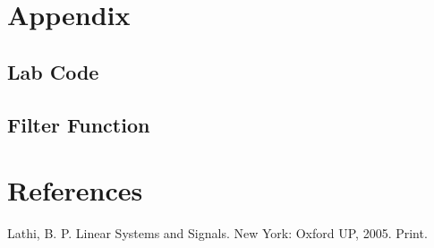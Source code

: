 \documentclass{article}
\begin{document}
\section{Appendix}
\subsection{Lab Code}

\subsection{Filter Function}

\section{References}

Lathi, B. P. Linear Systems and Signals. New York: Oxford UP, 2005. Print.
\end{document}
